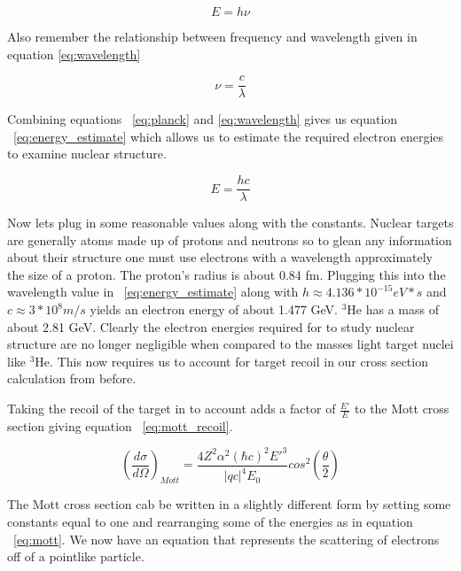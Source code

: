 \begin{equation} \label{eq:planck}
	E = h\nu
\end{equation}

\noindent Also remember the relationship between frequency and wavelength given in equation \ref{eq:wavelength}

\begin{equation} \label{eq:wavelength}
	\nu = \frac{c}{\lambda}
\end{equation}

\noindent Combining equations ~\ref{eq:planck} and \ref{eq:wavelength} gives us equation ~\ref{eq:energy_estimate} which allows us to estimate the required electron energies to examine nuclear structure. 

\begin{equation} \label{eq:energy_estimate}
	E = \frac{hc}{\lambda}
\end{equation}

Now lets plug in some reasonable values along with the constants. Nuclear targets are generally atoms made up of protons and neutrons so to glean any information about their structure one must use electrons with a wavelength approximately the size of a proton. The proton's radius is about 0.84 fm. Plugging this into the wavelength value in ~\ref{eq:energy_estimate} along with $h \approx 4.136 *10^{-15} eV*s$ and $c\approx 3*10^{8} m/s$ yields an electron energy of about 1.477 GeV. $^3$He has a mass of about 2.81 GeV. Clearly the electron energies required for to study nuclear structure are no longer negligible when compared to the masses light target nuclei like $^3$He. This now requires us to account for target recoil in our cross section calculation from before.

Taking the recoil of the target in to account adds a factor of $\frac{E'}{E}$ to the Mott cross section giving equation ~\ref{eq:mott_recoil}.

\begin{equation} \label{eq:mott_recoil}
\left(\frac{d\sigma}{d\Omega}\right)_{Mott} = \frac{4Z^2\alpha^2\left(\hbar c\right)^2E'^3}{|qc|^4 E_0} cos^2 \left( \frac{\theta}{2} \right)
\end{equation}

\noindent The Mott cross section cab be written in a slightly different form by setting some constants equal to one and rearranging some of the energies as in equation ~\ref{eq:mott}. We now have an equation that represents the scattering of electrons off of a pointlike particle.

